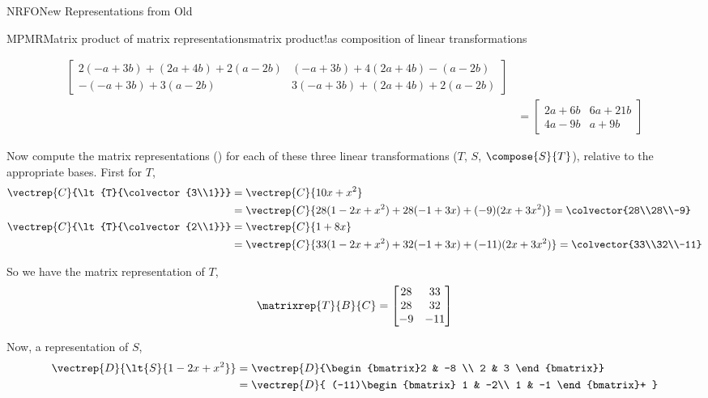 \begin{subsect}{NRFO}{New Representations from Old}
\begin{example}{MPMR}{Matrix product of matrix representations}{matrix product!as composition of linear transformations}
\begin{para}
\begin{align*}
\begin{bmatrix}
2(-a + 3b) + (2a + 4b) + 2(a - 2b) & (-a + 3b) + 4(2a + 4b) - (a - 2b)\\
-(-a + 3b) + 3(a - 2b) & 3(-a + 3b) + (2a + 4b) + 2(a - 2b)
\end{bmatrix}\\
&=
\begin{bmatrix}
2a + 6b & 6a + 21b\\
4a - 9b &a + 9b
\end{bmatrix}
\end{align*}
\end{para}
%
\begin{para}Now compute the matrix representations () for each of these three linear transformations ($T$, $S$, $\compose{S}{T}$), relative to the appropriate bases.  First for $T$,
%
\begin{align*}
\vectrep{C}{\lt{T}{\colvector{3\\1}}}&=\vectrep{C}{10x+x^2}\\
&=\vectrep{C}{28(1-2x+x^2)+28(-1+3x)+(-9)(2x+3x^2)}=\colvector{28\\28\\-9}\\
%
\vectrep{C}{\lt{T}{\colvector{2\\1}}}&=\vectrep{C}{1+8x}\\
&=\vectrep{C}{33(1-2x+x^2)+32(-1+3x)+(-11)(2x+3x^2)}=\colvector{33\\32\\-11}\\
%
\end{align*}
\end{para}
%
\begin{para}So we have the matrix representation of $T$,
%
\begin{equation*}
\matrixrep{T}{B}{C}=
\begin{bmatrix}
 28 & 33 \\
 28 & 32 \\
 -9 & -11
\end{bmatrix}
\end{equation*}
\end{para}
%
\begin{para}Now, a representation of $S$,
\begin{align*}
\vectrep{D}{\lt{S}{1-2x+x^2}}&=\vectrep{D}{\begin{bmatrix}2 & -8 \\ 2 & 3 \end{bmatrix}}\\
&=\vectrep{D}{
(-11)\begin{bmatrix} 1 & -2\\ 1 & -1 \end{bmatrix}+
}
\end{align*}
\end{para}
\end{example}
\end{subsect}
